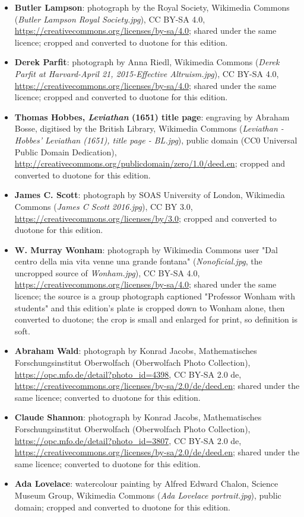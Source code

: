 \begin{itemize}
\item \textbf{Butler Lampson}: photograph by the Royal Society, Wikimedia
  Commons (\emph{Butler Lampson Royal Society.jpg}), CC BY-SA 4.0,
  \url{https://creativecommons.org/licenses/by-sa/4.0}; shared under the same
  licence; cropped and converted to duotone for this edition.

\item \textbf{Derek Parfit}: photograph by Anna Riedl, Wikimedia Commons
  (\emph{Derek Parfit at Harvard-April 21, 2015-Effective Altruism.jpg}), CC
  BY-SA 4.0, \url{https://creativecommons.org/licenses/by-sa/4.0}; shared
  under the same licence; cropped and converted to duotone for this edition.

\item \textbf{Thomas Hobbes, \emph{Leviathan} (1651) title page}: engraving by
  Abraham Bosse, digitised by the British Library, Wikimedia Commons
  (\emph{Leviathan - Hobbes' Leviathan (1651), title page - BL.jpg}), public
  domain (CC0 Universal Public Domain Dedication),
  \url{http://creativecommons.org/publicdomain/zero/1.0/deed.en}; cropped and
  converted to duotone for this edition.

\item \textbf{James C. Scott}: photograph by SOAS University of London,
  Wikimedia Commons (\emph{James C Scott 2016.jpg}), CC BY 3.0,
  \url{https://creativecommons.org/licenses/by/3.0}; cropped and converted to
  duotone for this edition.

\item \textbf{W. Murray Wonham}: photograph by Wikimedia Commons user "Dal
  centro della mia vita venne una grande fontana" (\emph{Nonoficial.jpg}, the
  uncropped source of \emph{Wonham.jpg}), CC BY-SA 4.0,
  \url{https://creativecommons.org/licenses/by-sa/4.0}; shared under the same
  licence; the source is a group photograph captioned "Professor Wonham with
  students" and this edition's plate is cropped down to Wonham alone, then
  converted to duotone; the crop is small and enlarged for print, so
  definition is soft.

\item \textbf{Abraham Wald}: photograph by Konrad Jacobs, Mathematisches
  Forschungsinstitut Oberwolfach (Oberwolfach Photo Collection),
  \url{https://opc.mfo.de/detail?photo_id=4398}, CC BY-SA 2.0 de,
  \url{https://creativecommons.org/licenses/by-sa/2.0/de/deed.en}; shared
  under the same licence; converted to duotone for this edition.

\item \textbf{Claude Shannon}: photograph by Konrad Jacobs, Mathematisches
  Forschungsinstitut Oberwolfach (Oberwolfach Photo Collection),
  \url{https://opc.mfo.de/detail?photo_id=3807}, CC BY-SA 2.0 de,
  \url{https://creativecommons.org/licenses/by-sa/2.0/de/deed.en}; shared
  under the same licence; converted to duotone for this edition.

\item \textbf{Ada Lovelace}: watercolour painting by Alfred Edward Chalon,
  Science Museum Group, Wikimedia Commons (\emph{Ada Lovelace
  portrait.jpg}), public domain; cropped and converted to duotone for this
  edition.

\end{itemize}

